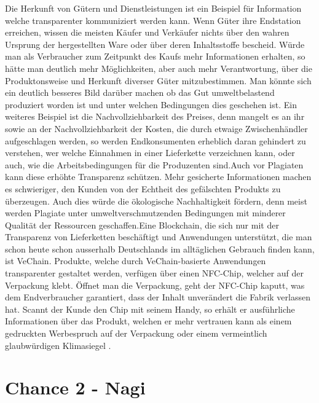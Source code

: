 Die Herkunft von Gütern und Dienstleistungen ist ein Beispiel für Information welche transparenter kommuniziert werden kann. Wenn Güter ihre Endstation erreichen, wissen die meisten Käufer und Verkäufer nichts über den wahren Ursprung der hergestellten Ware oder über deren Inhaltsstoffe bescheid. Würde man als Verbraucher zum Zeitpunkt des Kaufs mehr Informationen erhalten, so hätte man deutlich mehr Möglichkeiten, aber auch mehr Verantwortung, über die Produktonsweise und Herkunft diverser Güter mitzubestimmen. Man könnte sich ein deutlich besseres Bild darüber machen ob das Gut umweltbelastend produziert worden ist und unter welchen Bedingungen dies geschehen ist. \newline Ein weiteres Beispiel ist die Nachvollziehbarkeit des Preises, denn mangelt es an ihr sowie an der Nachvollziehbarkeit der Kosten, die durch etwaige Zwischenhändler aufgeschlagen werden, so werden Endkonsumenten erheblich daran gehindert zu verstehen, wer welche Einnahmen in einer Lieferkette verzeichnen kann, oder auch, wie die Arbeitsbedingungen für die Produzenten sind\cite{lieferkette}.\newline Auch vor Plagiaten kann diese erhöhte Transparenz schützen. Mehr gesicherte Informationen machen es schwieriger, den Kunden von der Echtheit des gefälschten Produkts zu überzeugen. Auch dies würde die ökologische Nachhaltigkeit fördern, denn meist werden Plagiate unter umweltverschmutzenden Bedingungen mit minderer Qualität der Ressourcen geschaffen.\newline Eine Blockchain, die sich nur mit der Transparenz von Lieferketten beschäftigt und Anwendungen unterstützt, die man schon heute schon ausserhalb Deutschlands im alltäglichen Gebrauch finden kann, ist VeChain. Produkte, welche durch VeChain-basierte Anwendungen transparenter gestaltet werden, verfügen über einen NFC-Chip, welcher auf der Verpackung klebt. Öffnet man die Verpackung, geht der NFC-Chip kaputt, was dem Endverbraucher garantiert, dass der Inhalt unverändert die Fabrik verlassen hat. Scannt der Kunde den Chip mit seinem Handy, so erhält er ausführliche Informationen über das Produkt, welchen er mehr vertrauen kann als einem gedruckten Werbespruch auf der Verpackung oder einem vermeintlich glaubwürdigen Klimasiegel \cite{vechain}\cite{veDoc}.
\section{Chance 2 - Nagi}

